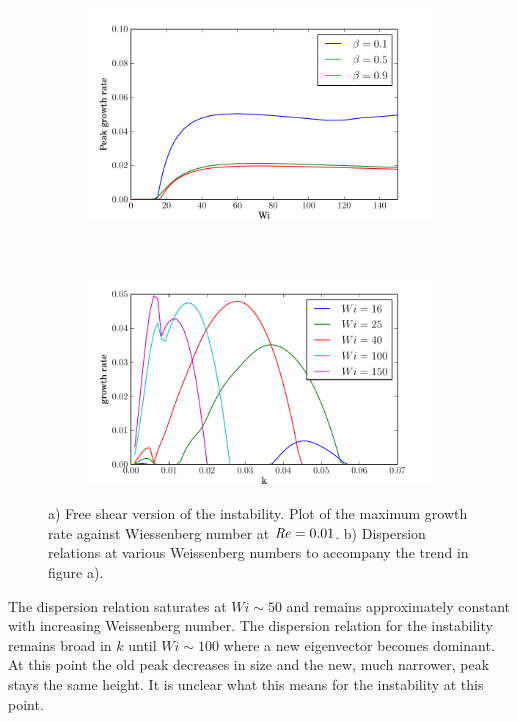\documentclass{jfm}
\newcommand\Rey{\mbox{\textit{Re}}}  %
\begin{document}
\begin{figure}
    \centering
    \begin{subfigure}[b]{0.48\textwidth}
	\centering
	\includegraphics[width=\textwidth]{inf_purely_elastic}
	\caption{}
	\label{fig:inf_low_Re}
    \end{subfigure}
    ~
    \begin{subfigure}[b]{0.48\textwidth}
	\centering
	\includegraphics[width=\textwidth]{inf_dispersions_low_Re}
	\caption{}
	\label{fig:dispersions_low_Re}
    \end{subfigure}
    \caption{a) Free shear version of the instability. Plot of the maximum growth rate against Wiessenberg number at $\Rey = 0.01$. b) Dispersion relations at various Weissenberg numbers to accompany the trend in figure a).}
\end{figure}

The dispersion relation saturates at $Wi \sim 50$ and remains approximately constant with increasing Weissenberg number. The dispersion relation for the instability remains broad in $k$ until $Wi \sim 100$ where a new eigenvector becomes dominant. At this point the old peak decreases in size and the new, much narrower, peak stays the same height. It is unclear what this means for the instability at this point.
\end{document}
